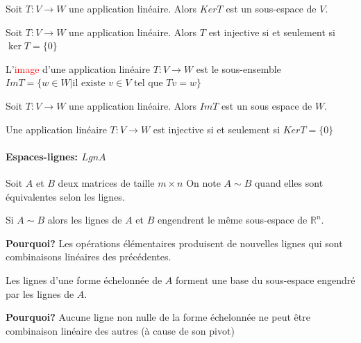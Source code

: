\begin{theoreme}
    Soit $T: V \to W$ une application linéaire. Alors $KerT$ est un sous-espace de $V$.
\end{theoreme}
\begin{definition}
Soit $T : V \to W$ une application linéaire. Alors $T$ est injective si et seulement si $\ker T = \{0\}$ 
\end{definition}
\begin{definition}
    L'\textcolor{red}{image} d'une application linéaire $T : V \to W$ est le sous-ensemble $Im T = \{w \in W| \text{il existe } v \in V $ tel que $Tv = w\}$
\end{definition}
\begin{theoreme}
    Soit $T : V \to W$ une application linéaire. Alors $Im T$ est un sous espace de $W$.
\end{theoreme}
\begin{theoreme}
    Une application linéaire $T: V \to W$ est injective si et seulement si $Ker T = \{0\}$ 
\end{theoreme}
\paragraph{Espaces-lignes: $LgnA$}
Soit $A$ et $B$ deux matrices de taille $m\times n$ On note $A  \sim B$ quand elles sont équivalentes selon les lignes.
\begin{theoreme}
    Si $A \sim B$ alors les lignes de $A$ et $B$ engendrent le même sous-espace de $\mathbb{R}^n$.   
\end{theoreme}
\textbf{Pourquoi?} Les opérations élémentaires produisent de nouvelles lignes qui sont combinaisons linéaires des précédentes.
\begin{theoreme}
    Les lignes d'une forme échelonnée de $A$ forment une base du sous-espace engendré par les lignes de $A$.
\end{theoreme}
\textbf{Pourquoi?} Aucune ligne non nulle de la forme échelonnée ne peut être combinaison linéaire des autres (à cause de son pivot)

